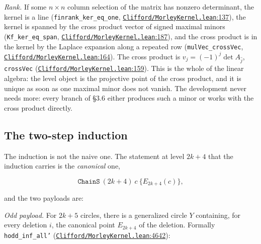 \documentclass[11pt]{article}
\providecommand{\textquotesingle}{'}
\theoremstyle{definition}
\theoremstyle{remark}
\begin{document}
\emph{Rank.} If some \(n \times n\) column selection of the matrix has nonzero determinant, the kernel is a line
(\texttt{finrank\_\allowbreak ker\_\allowbreak eq\_\allowbreak one}, \href{https://github.com/jpbald93/paperl_clifford_chain/blob/e1ae145c2565cc98816635387412edc0a740c27c/Clifford/MorleyKernel.lean\#L137}{\texttt{Clifford/\allowbreak MorleyKernel.lean}:137}), the kernel is spanned by the cross product
vector of signed maximal minors (\texttt{Kf\_\allowbreak ker\_\allowbreak eq\_\allowbreak span}, \href{https://github.com/jpbald93/paperl_clifford_chain/blob/e1ae145c2565cc98816635387412edc0a740c27c/Clifford/MorleyKernel.lean\#L187}{\texttt{Clifford/\allowbreak MorleyKernel.lean}:187}), and the cross product
is in the kernel by the Laplace expansion along a repeated row (\texttt{mulVec\_\allowbreak crossVec},
\href{https://github.com/jpbald93/paperl_clifford_chain/blob/e1ae145c2565cc98816635387412edc0a740c27c/Clifford/MorleyKernel.lean\#L164}{\texttt{Clifford/\allowbreak MorleyKernel.lean}:164}). The cross product is
\(v_j = (-1)^j \det A_{\hat j}\), \texttt{crossVec} (\href{https://github.com/jpbald93/paperl_clifford_chain/blob/e1ae145c2565cc98816635387412edc0a740c27c/Clifford/MorleyKernel.lean\#L159}{\texttt{Clifford/\allowbreak MorleyKernel.lean}:159}). This is the whole of the
linear algebra: the level object is the projective point of the cross product, and it is unique as soon as
one maximal minor does not vanish. The development never needs more: every branch of \S{}3.6 either produces
such a minor or works with the cross product directly.

\hypertarget{the-two-step-induction}{%
\subsection{The two-step induction}\label{the-two-step-induction}}

The induction is not the naive one. The statement at level \(2k+4\) that the induction carries is the
\emph{canonical} one,

\[ \texttt{ChainS}\ (2k+4)\ c\ \{E_{2k+4}(c)\}, \]

and the two payloads are:

\emph{Odd payload.} For \(2k+5\) circles, there is a generalized circle \(Y\) containing, for every deletion \(i\),
the canonical point \(E_{2k+4}\) of the deletion. Formally \texttt{hodd\_inf\_all\textquotesingle{}}
(\href{https://github.com/jpbald93/paperl_clifford_chain/blob/e1ae145c2565cc98816635387412edc0a740c27c/Clifford/MorleyKernel.lean\#L4642}{\texttt{Clifford/\allowbreak MorleyKernel.lean}:4642}):
\end{document}
